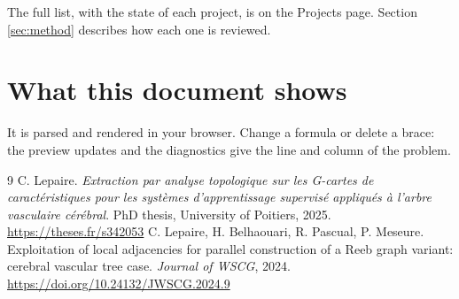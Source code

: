 \documentclass{article}
\begin{document}
\noindent The full list, with the state of each project, is on the Projects page. Section
\ref{sec:method} describes how each one is reviewed.

\section{What this document shows}
It is parsed and rendered in your browser. Change a formula or delete a brace: the preview updates
and the diagnostics give the line and column of the problem.

\begin{thebibliography}{9}
 C. Lepaire. \emph{Extraction par analyse topologique sur les G-cartes de
caractéristiques pour les systèmes d'apprentissage supervisé appliqués à l'arbre vasculaire
cérébral}. PhD thesis, University of Poitiers, 2025. \url{https://theses.fr/s342053}
 C. Lepaire, H. Belhaouari, R. Pascual, P. Meseure. Exploitation of local adjacencies
for parallel construction of a Reeb graph variant: cerebral vascular tree case. \emph{Journal of
WSCG}, 2024. \url{https://doi.org/10.24132/JWSCG.2024.9}
\end{thebibliography}
\end{document}
